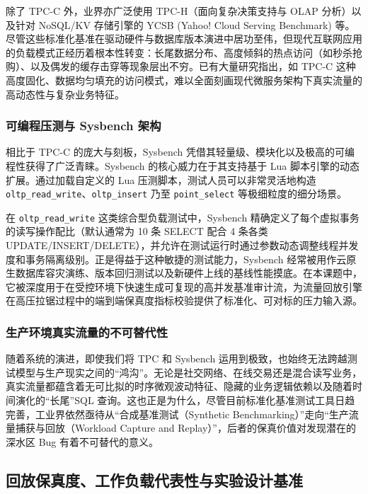 除了 TPC-C 外，业界亦广泛使用 TPC-H（面向复杂决策支持与 OLAP 分析）以及针对 NoSQL/KV 存储引擎的 YCSB (Yahoo! Cloud Serving Benchmark) 等。尽管这些标准化基准在驱动硬件与数据库版本演进中居功至伟，但现代互联网应用的负载模式正经历着根本性转变：长尾数据分布、高度倾斜的热点访问（如秒杀抢购）、以及偶发的缓存击穿等现象层出不穷。已有大量研究指出，如 TPC-C 这种高度固化、数据均匀填充的访问模式，难以全面刻画现代微服务架构下真实流量的高动态性与复杂业务特征\cite{ProductionWorkload, TPCCModeling}。

\subsubsection{可编程压测与 Sysbench 架构}

相比于 TPC-C 的庞大与刻板，Sysbench 凭借其轻量级、模块化以及极高的可编程性获得了广泛青睐。Sysbench 的核心威力在于其支持基于 Lua 脚本引擎的动态扩展。通过加载自定义的 Lua 压测脚本，测试人员可以非常灵活地构造 \texttt{oltp\_read\_write}、\texttt{oltp\_insert} 乃至 \texttt{point\_select} 等极细粒度的细分场景。

在 \texttt{oltp\_read\_write} 这类综合型负载测试中，Sysbench 精确定义了每个虚拟事务的读写操作配比（默认通常为 10 条 SELECT 配合 4 条各类 UPDATE/INSERT/DELETE），并允许在测试运行时通过参数动态调整线程并发度和事务隔离级别。正是得益于这种敏捷的测试能力，Sysbench 经常被用作云原生数据库容灾演练、版本回归测试以及新硬件上线的基线性能摸底。在本课题中，它被深度用于在受控环境下快速生成可复现的高并发基准审计流，为流量回放引擎在高压拉锯过程中的端到端保真度指标校验提供了标准化、可对标的压力输入源\cite{OLTPBench}。

\subsubsection{生产环境真实流量的不可替代性}

随着系统的演进，即使我们将 TPC 和 Sysbench 运用到极致，也始终无法跨越测试模型与生产现实之间的“鸿沟”。无论是社交网络、在线交易还是混合读写业务，真实流量都蕴含着无可比拟的时序微观波动特征、隐藏的业务逻辑依赖以及随着时间演化的“长尾”SQL 查询。这也正是为什么，尽管目前标准化基准测试工具日趋完善，工业界依然亟待从“合成基准测试（Synthetic Benchmarking）”走向“生产流量捕获与回放（Workload Capture and Replay）”，后者的保真价值对发现潜在的深水区 Bug 有着不可替代的意义。

\subsection{回放保真度、工作负载代表性与实验设计基准}

